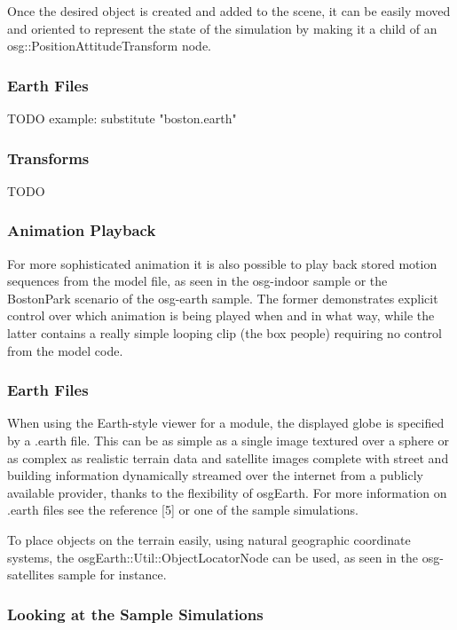 Once the desired object is created and added to the scene, it can be easily
moved and oriented to represent the state of the simulation by making it a
child of an osg::PositionAttitudeTransform node.

\subsubsection{Earth Files}

TODO example: substitute "boston.earth"


\subsubsection{Transforms}

TODO

\subsubsection{Animation Playback}

For more sophisticated animation it is also possible to play back stored
motion sequences from the model file, as seen in the osg-indoor sample or
the BostonPark scenario of the osg-earth sample. The former demonstrates
explicit control over which animation is being played when and in what way,
while the latter contains a really simple looping clip (the box people)
requiring no control from the model code.

\subsubsection{Earth Files}

When using the Earth-style viewer for a module, the displayed globe is
specified by a .earth file. This can be as simple as a single image
textured over a sphere or as complex as realistic terrain data and
satellite images complete with street and building information dynamically
streamed over the internet from a publicly available provider, thanks to
the flexibility of osgEarth. For more information on .earth files see the
reference [5] or one of the sample simulations.

To place objects on the terrain easily, using natural geographic coordinate
systems, the osgEarth::Util::ObjectLocatorNode can be used, as seen in the
osg-satellites sample for instance.

\subsubsection{Looking at the Sample Simulations}


